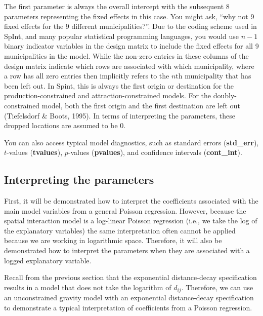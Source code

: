 \documentclass[11pt]{article}
\begin{document}
    The first parameter is always the overall intercept with the subsequent
8 parameters representing the fixed effects in this case. You might ask,
``why not 9 fixed effects for the 9 different municipalities?''. Due to
the coding scheme used in SpInt, and many popular statistical
programming languages, you would use \(n - 1\) binary indicator
variables in the design matrix to include the fixed effects for all 9
municipalities in the model. While the non-zero entries in these columns
of the design matrix indicate which rows are associated with which
municipality, where a row has all zero entries then implicitly refers
to the \(n\)th municipality that has been left out. In Spint, this is
always the first origin or destination for the production-constrained
and attraction-constrained models. For the doubly-constrained model,
both the first origin and the first destination are left out
(Tiefelsdorf \& Boots, 1995). In terms of interpreting the parameters,
these dropped locations are assumed to be 0. 

You can also access typical model diagnostics, such as standard errors (\textbf{std\_err}), $t$-values (\textbf{tvalues}), $p$-values (\textbf{pvalues}), and confidence intervals (\textbf{cont\_int}).


    \subsection{Interpreting the
parameters}\label{interpretting-the-parameters}

    First, it will be demonstrated how to interpret the coefficients
associated with the main model variables from a general Poisson
regression. However, because the spatial interaction model is a
log-linear Poisson regression (i.e., we take the log of the explanatory
variables) the same interpretation often cannot be applied because we are
working in logarithmic space. Therefore, it will also be demonstrated
how to interpret the parameters when they are associated with a logged
explanatory variable.

Recall from the previous section that the exponential distance-decay
specification results in a model that does not take the logarithm of
\(d_{ij}\). Therefore, we can use an unconstrained gravity model with an
exponential distance-decay specification to demonstrate a typical
interpretation of coefficients from a Poisson regression.
\end{document}
